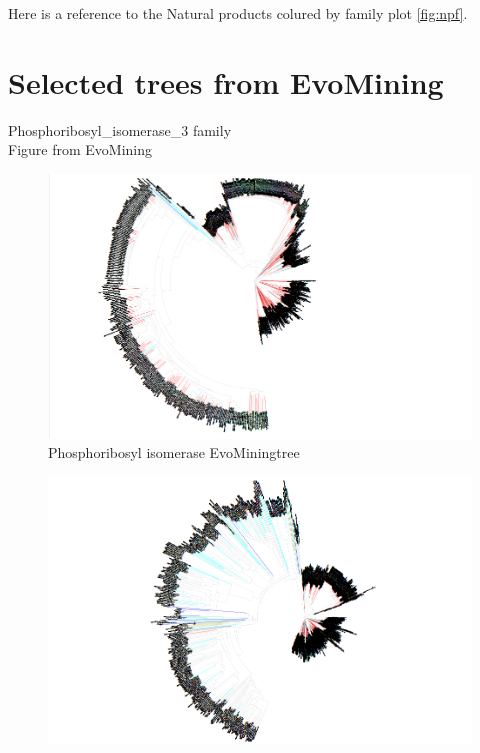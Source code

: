 \documentclass[12pt,twoside]{reedthesis}
\begin{document}
  Here is a reference to the Natural products colured by family plot
  \autoref{fig:npf}. \clearpage 
  
  \section{Selected trees from
  EvoMining}\label{selected-trees-from-evomining-2}
  
  Phosphoribosyl\_isomerase\_3 family\\
  Figure from EvoMining
  
  \begin{figure}[h!tbp]
  \centering
  \includegraphics[angle = 180,scale = 0.25]{chapter5/tree64.png}
  \caption[Phosphoribosyl isomerase EvoMiningtree]{\normalsize{Phosphoribosyl isomerase EvoMiningtree}}
  \label{fig:Phosphoribosyl_isomerase_evo_tree}
  \end{figure}\begin{figure}[h!tbp]
  \centering
  \includegraphics[angle = 180,scale = 0.25]{chapter5/tree1.png}

\end{figure}
\end{document}
